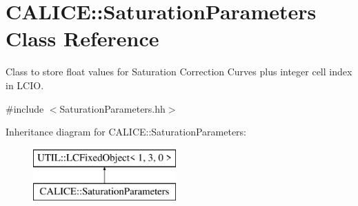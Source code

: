 \section{C\-A\-L\-I\-C\-E\-:\-:Saturation\-Parameters Class Reference}
\label{classCALICE_1_1SaturationParameters}


Class to store float values for Saturation Correction Curves plus integer cell index in L\-C\-I\-O.  




{\ttfamily \#include $<$Saturation\-Parameters.\-hh$>$}

Inheritance diagram for C\-A\-L\-I\-C\-E\-:\-:Saturation\-Parameters\-:\begin{figure}[H]
\begin{center}
\leavevmode
\includegraphics[height=2.000000cm]{classCALICE_1_1SaturationParameters}
\end{center}
\end{figure}
